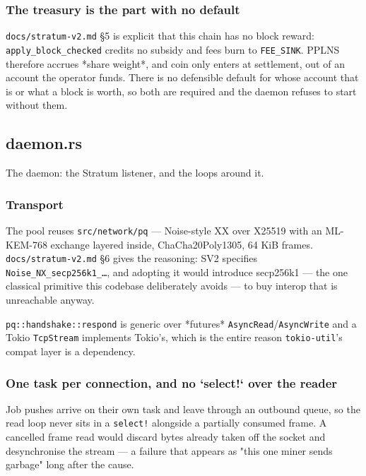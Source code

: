 \documentclass[11pt,a4paper]{article}
\begin{document}
\subsubsection{The treasury is the part with no default}

\texttt{docs/stratum-v2.md} §5 is explicit that this chain has no block reward:
\texttt{apply\_block\_checked} credits no subsidy and fees burn to \texttt{FEE\_SINK}. PPLNS
therefore accrues *share weight*, and coin only enters at settlement, out of
an account the operator funds. There is no defensible default for whose
account that is or what a block is worth, so both are required and the
daemon refuses to start without them.

\subsection{daemon.rs}
The daemon: the Stratum listener, and the loops around it.

\subsubsection{Transport}

The pool reuses \texttt{src/network/pq} — Noise-style XX over X25519 with an
ML-KEM-768 exchange layered inside, ChaCha20Poly1305, 64 KiB frames.
\texttt{docs/stratum-v2.md} §6 gives the reasoning: SV2 specifies
\texttt{Noise\_NX\_secp256k1\_…}, and adopting it would introduce secp256k1 — the one
classical primitive this codebase deliberately avoids — to buy interop that
is unreachable anyway.

\texttt{pq::handshake::respond} is generic over *futures* \texttt{AsyncRead}/\texttt{AsyncWrite}
and a Tokio \texttt{TcpStream} implements Tokio's, which is the entire reason
\texttt{tokio-util}'s compat layer is a dependency.

\subsubsection{One task per connection, and no `select!` over the reader}

Job pushes arrive on their own task and leave through an outbound queue, so
the read loop never sits in a \texttt{select!} alongside a partially consumed
frame. A cancelled frame read would discard bytes already taken off the
socket and desynchronise the stream — a failure that appears as "this one
miner sends garbage" long after the cause.
\end{document}
